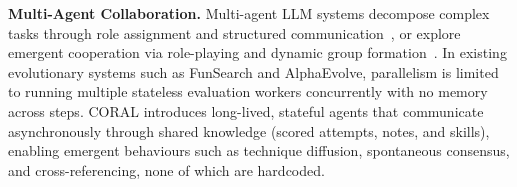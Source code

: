  
\textbf{Multi-Agent Collaboration.}
Multi-agent LLM systems decompose complex tasks through role assignment and structured communication~\citep{wu2023autogen,langgraph2024,qian2024chatdev,hong2024metagpt}, or explore emergent cooperation via role-playing and dynamic group formation~\citep{li2023camel,chen2024agentverse}.
In existing evolutionary systems such as FunSearch and AlphaEvolve, parallelism is limited to running multiple stateless evaluation workers concurrently with no memory across steps.
CORAL introduces long-lived, stateful agents that communicate asynchronously through shared knowledge (scored attempts, notes, and skills), enabling emergent behaviours such as technique diffusion, spontaneous consensus, and cross-referencing, none of which are hardcoded.
 

